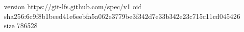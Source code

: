 version https://git-lfs.github.com/spec/v1
oid sha256:6c9f8b1beed41e6eebfa5a062e3779be3f342d7e33b342e23c715c11cd045426
size 786528
